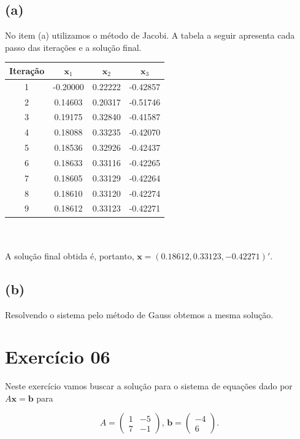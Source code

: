 \documentclass{article}
\begin{document}
\subsection*{(a)}

No item (a) utilizamos o método de Jacobi. 
A tabela a seguir apresenta cada passo das iterações e a solução final.

\begin{tabular}{ c c c c }
Iteração & $\mathbf{x}_1$ & $\mathbf{x}_2$ & $\mathbf{x}_3$ \\ \hline
1 & -0.20000 & 0.22222 & -0.42857 \\
2 &  0.14603 & 0.20317 & -0.51746 \\
3 &  0.19175 & 0.32840 & -0.41587 \\
4 &  0.18088 & 0.33235 & -0.42070 \\
5 &  0.18536 & 0.32926 & -0.42437 \\
6 &  0.18633 & 0.33116 & -0.42265 \\
7 &  0.18605 & 0.33129 & -0.42264 \\
8 &  0.18610 & 0.33120 & -0.42274 \\
9 &  0.18612 & 0.33123 & -0.42271
\end{tabular} \\ \\

A solução final obtida é, portanto, $\mathbf{x} = (0.18612, 0.33123, -0.42271)'$.

\subsection*{(b)}

Resolvendo o sistema pelo método de Gauss obtemos a mesma solução.

\section*{Exercício 06}

Neste exercício vamos buscar a solução para o sistema de equações dado por $A \mathbf{x} = \mathbf{b}$ para 

\[
A = \begin{pmatrix}
    1 & -5 \\
    7 & -1
\end{pmatrix}
, \,
\mathbf{b} = 
\begin{pmatrix}
	-4 \\
	 6
\end{pmatrix}.
\] \\
\end{document}
